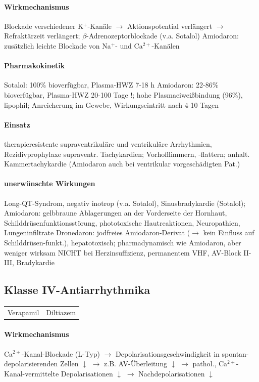 \documentclass[10pt,a4paper]{report}
\begin{document}
\paragraph{Wirkmechanismus} Blockade verschiedener K$^+$-Kanäle 	$\rightarrow$ Aktionspotential verlängert $\rightarrow$ Refraktärzeit verlängert; $\beta$-Adrenozeptorblockade (v.a. Sotalol)
Amiodaron: zusätzlich leichte Blockade von Na$^+$- und Ca$^{2+}$-Kanälen

\paragraph{Pharmakokinetik} Sotalol: 100\% bioverfügbar, Plasma-HWZ 7-18 h
Amiodaron: 22-86\% bioverfügbar, Plasma-HWZ 20-100 Tage !;
hohe Plasmaeiweißbindung (96\%), lipophil; Anreicherung im Gewebe, Wirkungseintritt nach 4-10 Tagen

\paragraph{Einsatz} therapieresistente supraventrikuläre und ventrikuläre Arrhythmien,
Rezidivprophylaxe supraventr. Tachykardien; Vorhofflimmern, -flattern; anhalt. Kammertachykardie (Amiodaron auch bei ventrikular vorgeschädigten Pat.)

\paragraph{unerwünschte Wirkungen} Long-QT-Syndrom, negativ inotrop (v.a. Sotalol), Sinusbradykardie (Sotalol); Amiodaron: gelbbraune Ablagerungen an der Vorderseite der Hornhaut, Schilddrüsenfunktionsstörung, phototoxische Hautreaktionen, Neuropathien, Lungeninfiltrate
Dronedaron: jodfreies Amiodaron-Derivat ($\rightarrow$ kein Einfluss auf Schilddrüsen-funkt.), hepatotoxisch; pharmadynamisch wie Amiodaron, aber weniger wirksam
NICHT bei Herzinsuffizienz, permanentem VHF, AV-Block \degree II-III, Bradykardie

\subsection{Klasse IV-Antiarrhythmika}

\begin{tabularx}{\textwidth}{XX}
Verapamil&Diltiazem\\
\end{tabularx}

\paragraph{Wirkmechanismus} Ca$^{2+}$-Kanal-Blockade (L-Typ) $\rightarrow$ Depolarisationsgeschwindigkeit in spontan-depolarisierenden Zellen $\downarrow$ $\rightarrow$ z.B. AV-Überleitung $\downarrow$ $\rightarrow$ pathol., Ca$^{2+}$-Kanal-vermittelte Depolarisationen $\downarrow$ $\rightarrow$ Nachdepolarisationen $\downarrow$ 
\end{document}
